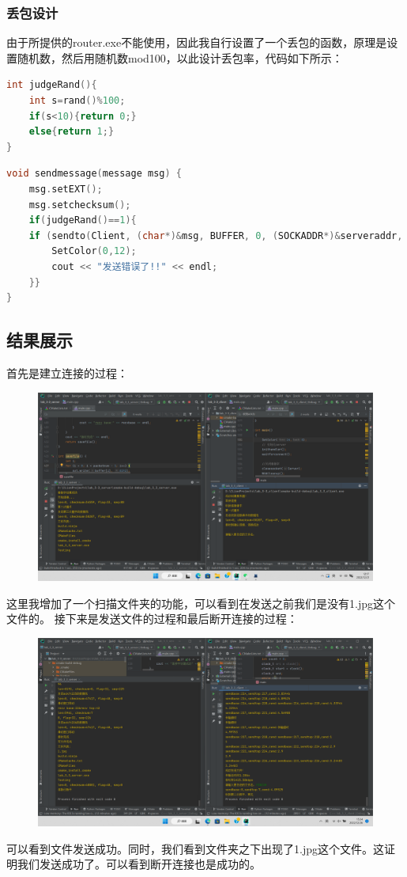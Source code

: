 \documentclass[UTF8,a4paper,10pt]{ctexart}
\begin{document}
\subsubsection{丢包设计}
由于所提供的router.exe不能使用，因此我自行设置了一个丢包的函数，原理是设置随机数，然后用随机数mod100，以此设计丢包率，代码如下所示：
\begin{lstlisting}[title=丢包函数,frame=trbl,language={C++}]
int judgeRand(){
    int s=rand()%100;
    if(s<10){return 0;}
    else{return 1;}
}
\end{lstlisting}
\begin{lstlisting}[title=发送函数,frame=trbl,language={C++}]
void sendmessage(message msg) {
    msg.setEXT();
    msg.setchecksum();
    if(judgeRand()==1){
    if (sendto(Client, (char*)&msg, BUFFER, 0, (SOCKADDR*)&serveraddr, sizeof(SOCKADDR)) == (SOCKET_ERROR)) {
        SetColor(0,12);
        cout << "发送错误了!!" << endl;
    }}
}
\end{lstlisting}
\subsection{结果展示}
首先是建立连接的过程：
\begin{figure}[H]
    \centering
    \includegraphics[scale=0.4]{GW1.png}
    \label{fig:6}
\end{figure}
这里我增加了一个扫描文件夹的功能，可以看到在发送之前我们是没有1.jpg这个文件的。
接下来是发送文件的过程和最后断开连接的过程：
\begin{figure}[H]
    \centering
    \includegraphics[scale=0.4]{GW2.png}
    \label{fig:7}
\end{figure}
可以看到文件发送成功。同时，我们看到文件夹之下出现了1.jpg这个文件。这证明我们发送成功了。可以看到断开连接也是成功的。
\end{document}

